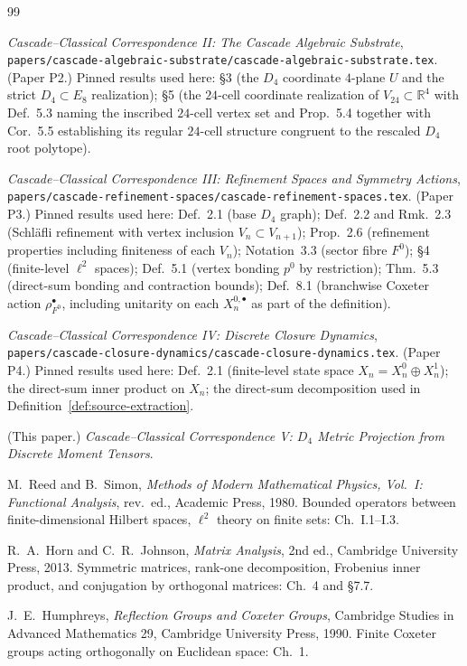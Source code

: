 \documentclass[11pt, a4paper]{amsart}
\theoremstyle{definition}
\newcommand{\R}{\mathbb{R}}
\begin{document}
\begin{thebibliography}{99}

\emph{Cascade--Classical Correspondence II: The Cascade Algebraic
Substrate},
\texttt{papers/cascade-algebraic-substrate/cascade-algebraic-substrate.tex}.
(Paper P2.) Pinned results used here: \S 3 (the $D_4$
coordinate $4$-plane $U$ and the strict $D_4 \subset E_8$
realization); \S 5 (the $24$-cell coordinate realization of
$V_{24} \subset \R^4$ with Def.~5.3 naming the inscribed
$24$-cell vertex set and Prop.~5.4 together with Cor.~5.5
establishing its regular $24$-cell structure congruent to the
rescaled $D_4$ root polytope).

\emph{Cascade--Classical Correspondence III: Refinement Spaces
and Symmetry Actions},
\texttt{papers/cascade-refinement-spaces/cascade-refinement-spaces.tex}.
(Paper P3.) Pinned results used here: Def.~2.1 (base $D_4$
graph); Def.~2.2 and Rmk.~2.3 (Schl\"{a}fli refinement with
vertex inclusion $V_n \subset V_{n+1}$); Prop.~2.6 (refinement
properties including finiteness of each $V_n$); Notation~3.3
(sector fibre $F^0$); \S 4 (finite-level $\ell^2$ spaces);
Def.~5.1 (vertex bonding $p^0$ by restriction); Thm.~5.3
(direct-sum bonding and contraction bounds); Def.~8.1 (branchwise
Coxeter action $\rho_{F^0}^\bullet$, including unitarity on each
$X_n^{0, \bullet}$ as part of the definition).

\emph{Cascade--Classical Correspondence IV: Discrete Closure
Dynamics},
\texttt{papers/cascade-closure-dynamics/cascade-closure-dynamics.tex}.
(Paper P4.) Pinned results used here: Def.~2.1 (finite-level
state space $X_n = X_n^0 \oplus X_n^1$); the direct-sum inner
product on $X_n$; the direct-sum decomposition used in
Definition~\ref{def:source-extraction}.

(This paper.) \emph{Cascade--Classical Correspondence V:
$D_4$ Metric Projection from Discrete Moment Tensors}.

M.~Reed and B.~Simon, \emph{Methods of Modern Mathematical
Physics, Vol.~I: Functional Analysis}, rev.\ ed., Academic
Press, 1980. Bounded operators between finite-dimensional
Hilbert spaces, $\ell^2$ theory on finite sets: Ch.~I.1--I.3.

R.~A.~Horn and C.~R.~Johnson, \emph{Matrix Analysis}, 2nd ed.,
Cambridge University Press, 2013. Symmetric matrices, rank-one
decomposition, Frobenius inner product, and conjugation by
orthogonal matrices: Ch.~4 and \S 7.7.

J.~E.~Humphreys, \emph{Reflection Groups and Coxeter Groups},
Cambridge Studies in Advanced Mathematics 29, Cambridge
University Press, 1990. Finite Coxeter groups acting
orthogonally on Euclidean space: Ch.~1.

\end{thebibliography}
\end{document}
